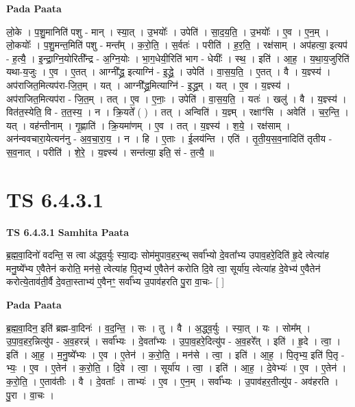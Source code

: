 \documentclass[17pt]{extarticle}
\begin{document}
\textbf{Pada Paata} \newline

लो॒के । प॒शु॒मानिति॑ पशु - मान् । स्या॒त् । उ॒भयोः᳚ । उपेति॑ । सा॒द॒य॒ति॒ । उ॒भयोः᳚ । ए॒व । ए॒न॒म् । लो॒कयोः᳚ । प॒शु॒मन्त॒मिति॑ पशु - मन्त᳚म् । क॒रो॒ति॒ । स॒र्वतः॑ । परीति॑ । ह॒र॒ति॒ । रक्ष॑साम् । अप॑हत्या॒ इत्यप॑ - ह॒त्यै॒ । इ॒न्द्रा॒ग्नि॒योरिती᳚न्द्र - अ॒ग्नि॒योः । भा॒ग॒धेयी॒रिति॑ भाग - धेयीः᳚ । स्थ॒ । इति॑ । आ॒ह॒ । य॒था॒य॒जुरिति॑ यथा-य॒जुः । ए॒व । ए॒तत् । आग्नी᳚द्ध्र॒ इत्याग्नि॑ - इ॒द्ध्रे॒ । उपेति॑ । वा॒स॒य॒ति॒ । ए॒तत् । वै । य॒ज्ञ्स्य॑ । अप॑राजित॒मित्यप॑रा-जि॒त॒म् । यत् । आग्नी᳚द्ध्र॒मित्याग्नि॑ - इ॒द्ध्र॒म् । यत् । ए॒व । य॒ज्ञ्स्य॑ । अप॑राजित॒मित्यप॑रा - जि॒त॒म् । तत् । ए॒व । ए॒नाः॒ । उपेति॑ । वा॒स॒य॒ति॒ । यतः॑ । खलु॑ । वै । य॒ज्ञ्स्य॑ । वित॑त॒स्येति॒ वि - त॒त॒स्य॒ । न । क्रि॒यते᳚ ( ) । तत् । अन्विति॑ । य॒ज्ञ्म् । रक्षाꣳ॑सि । अवेति॑ । च॒र॒न्ति॒ । यत् । वह॑न्तीनाम् । गृ॒ह्णाति॑ । क्रि॒यमा॑णम् । ए॒व । तत् । य॒ज्ञ्स्य॑ । श॒ये॒ । रक्ष॑साम् । अन॑न्ववचारा॒येत्यन॑नु - अ॒व॒चा॒रा॒य॒ । न । हि । ए॒ताः । ई॒लय॑न्ति । एति॑ । तृ॒ती॒य॒स॒व॒नादिति॑ तृतीय - स॒व॒नात् । परीति॑ । शे॒रे॒ । य॒ज्ञ्स्य॑ । सन्त॑त्या॒ इति॒ सं - त॒त्यै॒ ॥  \newline





\section{ TS 6.4.3.1 }

\textbf{TS 6.4.3.1 } \newline
\textbf{Samhita Paata} \newline

ब्र॒ह्म॒वा॒दिनो॑ वदन्ति॒ स त्वा अ॑द्ध्व॒र्युः स्या॒द्यः सोम॑मुपाव॒हर॒न्थ् सर्वा᳚भ्यो दे॒वता᳚भ्य उपाव॒हरे॒दिति॑ हृ॒दे त्वेत्या॑ह मनु॒ष्ये᳚भ्य ए॒वैतेन॑ करोति॒ मन॑से॒ त्वेत्या॑ह पि॒तृभ्य॑ ए॒वैतेन॑ करोति दि॒वे त्वा॒ सूर्या॑य॒ त्वेत्या॑ह दे॒वेभ्य॑ ए॒वैतेन॑ करोत्ये॒ताव॑ती॒र्वै दे॒वता॒स्ताभ्य॑ ए॒वैनꣳ॒॒ सर्वा᳚भ्य उ॒पाव॑हरति पु॒रा वा॒चः- [  ] \newline

\textbf{Pada Paata} \newline

ब्र॒ह्म॒वा॒दिन॒ इति॑ ब्रह्म-वा॒दिनः॑ । व॒द॒न्ति॒ । सः । तु । वै । अ॒द्ध्व॒र्युः । स्या॒त् । यः । सोम᳚म् । उ॒पा॒व॒हर॒न्नित्यु॑प - अ॒व॒हरन्न्॑ । सर्वा᳚भ्यः । दे॒वता᳚भ्यः । उ॒पा॒व॒हरे॒दित्यु॑प - अ॒व॒हरे᳚त् । इति॑ । हृ॒दे । त्वा॒ । इति॑ । आ॒ह॒ । म॒नु॒ष्ये᳚भ्यः । ए॒व । ए॒तेन॑ । क॒रो॒ति॒ । मन॑से । त्वा॒ । इति॑ । आ॒ह॒ । पि॒तृभ्य॒ इति॑ पि॒तृ - भ्यः॒ । ए॒व । ए॒तेन॑ । क॒रो॒ति॒ । दि॒वे । त्वा॒ । सूर्या॑य । त्वा॒ । इति॑ । आ॒ह॒ । दे॒वेभ्यः॑ । ए॒व । ए॒तेन॑ । क॒रो॒ति॒ । ए॒ताव॑तीः । वै । दे॒वताः᳚ । ताभ्यः॑ । ए॒व । ए॒न॒म् । सर्वा᳚भ्यः । उ॒पाव॑हर॒तीत्यु॑प - अव॑हरति । पु॒रा । वा॒चः ।  \newline
\end{document}
